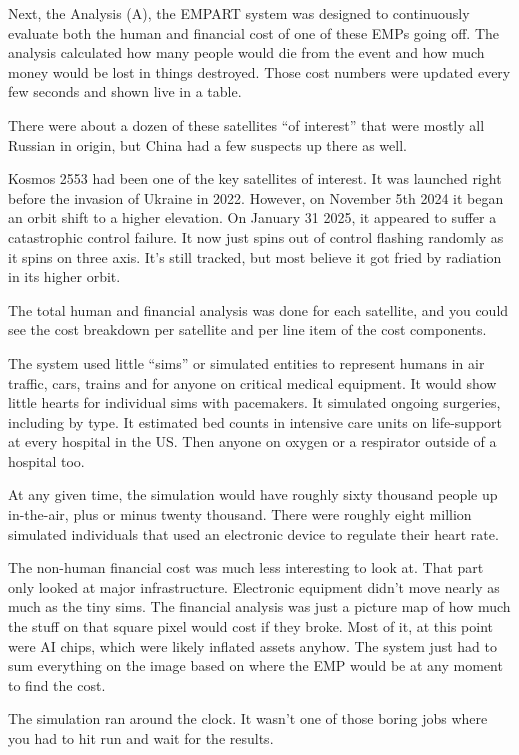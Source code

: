 \documentclass[17pt, twoside, a5paper, openright, extrafontsizes]{memoir}
\begin{document}
Next, the Analysis (A), the EMPART system was designed to continuously
evaluate both the human and financial cost of one of these EMPs going
off. The analysis calculated how many people would die from the event
and how much money would be lost in things destroyed. Those cost numbers
were updated every few seconds and shown live in a table.

There were about a dozen of these satellites ``of interest'' that were
mostly all Russian in origin, but China had a few suspects up there as
well.

Kosmos 2553 had been one of the key satellites of interest. It was
launched right before the invasion of Ukraine in 2022. However, on
November 5th 2024 it began an orbit shift to a higher elevation. On
January 31 2025, it appeared to suffer a catastrophic control failure.
It now just spins out of control flashing randomly as it spins on three
axis. It's still tracked, but most believe it got fried by radiation in
its higher orbit.

The total human and financial analysis was done for each satellite, and
you could see the cost breakdown per satellite and per line item of the
cost components.

The system used little ``sims'' or simulated entities to represent
humans in air traffic, cars, trains and for anyone on critical medical
equipment. It would show little hearts for individual sims with
pacemakers. It simulated ongoing surgeries, including by type. It
estimated bed counts in intensive care units on life-support at every
hospital in the US. Then anyone on oxygen or a respirator outside of a
hospital too.

At any given time, the simulation would have roughly sixty thousand
people up in-the-air, plus or minus twenty thousand. There were roughly
eight million simulated individuals that used an electronic device to
regulate their heart rate.

The non-human financial cost was much less interesting to look at. That
part only looked at major infrastructure. Electronic equipment didn't
move nearly as much as the tiny sims. The financial analysis was just a
picture map of how much the stuff on that square pixel would cost if
they broke. Most of it, at this point were AI chips, which were likely
inflated assets anyhow. The system just had to sum everything on the
image based on where the EMP would be at any moment to find the cost.

The simulation ran around the clock. It wasn't one of those boring jobs
where you had to hit run and wait for the results.
\end{document}
